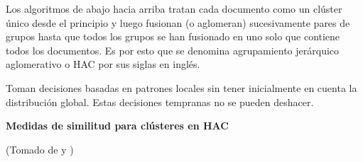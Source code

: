 \documentclass{llncs}
\begin{document}
\vspace{0.5em}
Los algoritmos de abajo hacia arriba tratan cada documento como un clúster único desde el principio y luego fusionan (o aglomeran) sucesivamente pares de grupos hasta que todos los grupos se han fusionado en uno solo que contiene todos los documentos. 
Es por esto que se denomina agrupamiento jerárquico aglomerativo o HAC por sus siglas en ingl\'es. 

Toman decisiones basadas en patrones locales sin tener inicialmente en cuenta la distribución global. Estas decisiones tempranas no se pueden deshacer.

\vspace{1em}
\textbf{Medidas de similitud para cl\'usteres en HAC}

\begin{flushright}
	\scriptsize*(Tomado de \cite{B1} y \cite{B3})
	\normalsize
\end{flushright}
\end{document}
